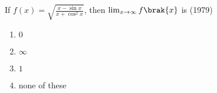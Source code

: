 \iffalse
  \title{Mains.11.A}
  \author{Shiven Bajpai}
  \section{mcq-single}
\fi
    

	\item{
 If $f(x) = \sqrt{\frac{x - \sin x}{x + \cos^2 x}}$, then $\lim_{x \to \infty} f\brak{x}$ is \hfill (1979)

    \begin{multicols}{2}
    \begin{enumerate}
        \item{$0$}
        \item{$\infty$}
        \columnbreak
        \item{$1$}
        \item{none of these}
    \end{enumerate}
    \end{multicols}
}
